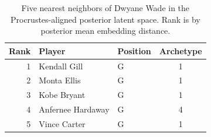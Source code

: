 \begin{table}[htbp]
  \centering\small
  \begin{tabular}{rllc}
    \toprule
    Rank & Player & Position & Archetype \\
    \midrule
    1 & Kendall Gill & G & 1 \\
    2 & Monta Ellis & G & 1 \\
    3 & Kobe Bryant & G & 1 \\
    4 & Anfernee Hardaway & G & 4 \\
    5 & Vince Carter & G & 1 \\
    \bottomrule
  \end{tabular}
  \caption{Five nearest neighbors of Dwyane Wade in the Procrustes-aligned posterior latent space. Rank is by posterior mean embedding distance.}
  \label{tab:Dwyane_Wade_neighbors}
\end{table}

